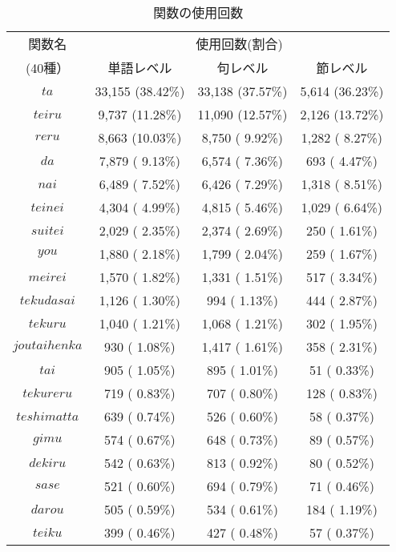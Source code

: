 \documentclass{nlp}
\begin{document}
\begin{table}[!htbp]
\footnotesize
\begin{center}
\caption{関数の使用回数}
\begin{tabular}{|c|c|c|c|}
\hline
関数名 & \multicolumn{3}{|c|}{使用回数(割合)} \\ \cline{2-4}
(40種）& 単語レベル & 句レベル & 節レベル \\ \hline
$ta$ & 33,155 (38.42\%) & 33,138 (37.57\%) & 5,614 (36.23\%) \\ \hline
$teiru$ & 9,737 (11.28\%) & 11,090 (12.57\%) & 2,126 (13.72\%) \\ \hline
$reru$ & 8,663 (10.03\%) & 8,750 ( 9.92\%) & 1,282 ( 8.27\%) \\ \hline
$da$ & 7,879 ( 9.13\%) & 6,574 ( 7.36\%) & 693 ( 4.47\%) \\ \hline
$nai$ & 6,489 ( 7.52\%) & 6,426 ( 7.29\%) & 1,318 ( 8.51\%) \\ \hline
$teinei$ & 4,304 ( 4.99\%) & 4,815 ( 5.46\%) & 1,029 ( 6.64\%) \\ \hline
$suitei$ & 2,029 ( 2.35\%) & 2,374 ( 2.69\%) & 250 ( 1.61\%) \\ \hline
$you$ & 1,880 ( 2.18\%) & 1,799 ( 2.04\%) & 259 ( 1.67\%) \\ \hline
$meirei$ & 1,570 ( 1.82\%) & 1,331 ( 1.51\%) & 517 ( 3.34\%) \\ \hline
$tekudasai$ & 1,126 ( 1.30\%) & 994 ( 1.13\%) & 444 ( 2.87\%) \\ \hline
$tekuru$ & 1,040 ( 1.21\%) & 1,068 ( 1.21\%) & 302 ( 1.95\%) \\ \hline
$joutaihenka$ & 930 ( 1.08\%) & 1,417 ( 1.61\%) & 358 ( 2.31\%) \\ \hline
$tai$ & 905 ( 1.05\%) & 895 ( 1.01\%) & 51 ( 0.33\%) \\ \hline
$tekureru$ & 719 ( 0.83\%) & 707 ( 0.80\%) & 128 ( 0.83\%) \\ \hline
$teshimatta$ & 639 ( 0.74\%) & 526 ( 0.60\%) & 58 ( 0.37\%)  \\ \hline
$gimu$ & 574 ( 0.67\%) & 648 ( 0.73\%) & 89 ( 0.57\%) \\ \hline
$dekiru$ & 542 ( 0.63\%) & 813 ( 0.92\%) & 80 ( 0.52\%) \\ \hline
$sase$ & 521 ( 0.60\%) & 694 ( 0.79\%) & 71 ( 0.46\%) \\ \hline
$darou$ & 505 ( 0.59\%) & 534 ( 0.61\%) & 184 ( 1.19\%) \\ \hline
$teiku$ & 399 ( 0.46\%) & 427 ( 0.48\%) & 57 ( 0.37\%) \\ \hline

\end{tabular}
\end{center}
\end{table}
\end{document}
